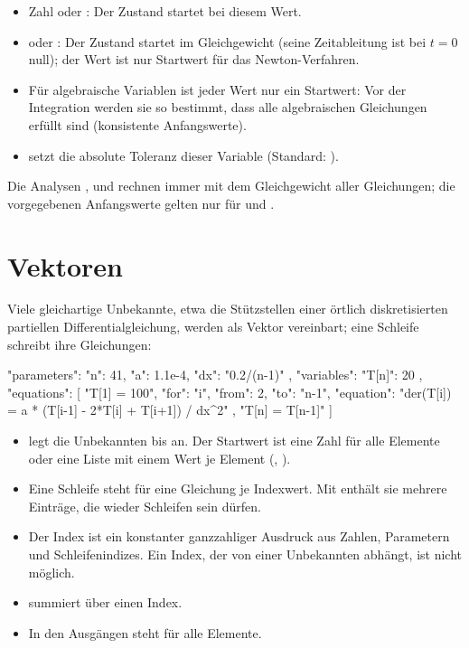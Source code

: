 \begin{itemize}
  \item Zahl oder : Der Zustand startet bei diesem Wert.
  \item {} oder : Der Zustand startet im
    Gleichgewicht (seine Zeitableitung ist bei $t=0$ null); der Wert ist nur
    Startwert für das Newton-Verfahren.
  \item Für algebraische Variablen ist jeder Wert nur ein Startwert: Vor
    der Integration werden sie so bestimmt, dass alle algebraischen
    Gleichungen erfüllt sind (konsistente Anfangswerte).
  \item {} setzt die absolute Toleranz dieser Variable
    (Standard: ).
\end{itemize}

Die Analysen ,  und  rechnen immer mit dem
Gleichgewicht aller Gleichungen; die vorgegebenen Anfangswerte gelten nur
für  und .

\section{Vektoren}
\label{sec:vektoren}

Viele gleichartige Unbekannte, etwa die Stützstellen einer örtlich
diskretisierten partiellen Differentialgleichung, werden als Vektor
vereinbart; eine Schleife schreibt ihre Gleichungen:

\begin{json}
"parameters": { "n": 41, "a": 1.1e-4, "dx": "0.2/(n-1)" },
"variables":  { "T[n]": 20 },
"equations": [
  "T[1] = 100",
  { "for": "i", "from": 2, "to": "n-1",
    "equation": "der(T[i]) = a * (T[i-1] - 2*T[i] + T[i+1]) / dx^2" },
  "T[n] = T[n-1]"
]
\end{json}

\begin{itemize}
  \item {} legt die Unbekannten  bis  an.
    Der Startwert ist eine Zahl für alle Elemente oder eine Liste mit einem
    Wert je Element (, ).
  \item Eine Schleife 
    steht für eine Gleichung je Indexwert. Mit 
    enthält sie mehrere Einträge, die wieder Schleifen sein dürfen.
  \item Der Index ist ein konstanter ganzzahliger Ausdruck aus Zahlen,
    Parametern und Schleifenindizes. Ein Index, der von einer Unbekannten
    abhängt, ist nicht möglich.
  \item {} summiert über einen Index.
  \item In den Ausgängen steht  für alle Elemente.
\end{itemize}

